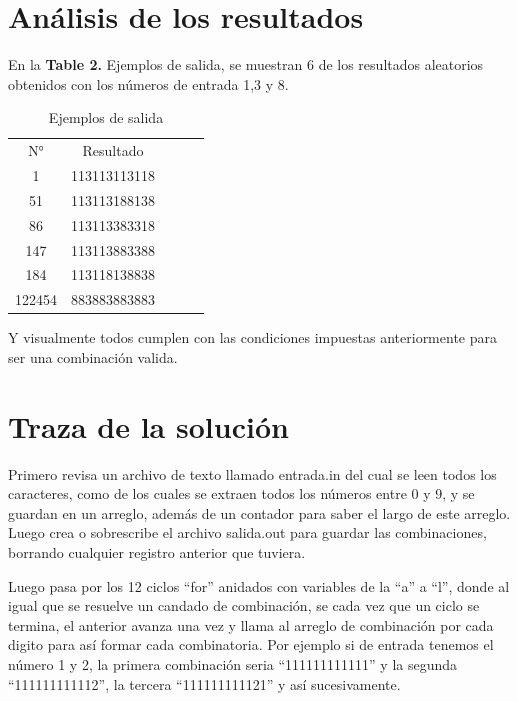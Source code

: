 \documentclass[9pt,twocolumn,twoside]{optica}
\begin{document}
\section{Análisis de los resultados}

En la \textbf{Table 2.} Ejemplos de salida, se muestran 6 de los resultados aleatorios obtenidos con los números de entrada 1,3 y 8. 

\begin{table}
\centering
\caption{Ejemplos de salida }
\label{my-label}
\begin{tabular}{|c|c|lll}
\cline{1-2}
N° & Resultado &  &  &  \\ \cline{1-2}
1         & 113113113118         &  &  &  \\ \cline{1-2}
51         & 113113188138         &  &  &  \\ \cline{1-2}
86         & 113113383318         &  &  &  \\ \cline{1-2}
147         & 113113883388         &  &  &  \\ \cline{1-2}
184         & 113118138838         &  &  &  \\ \cline{1-2}
122454         & 883883883883         &  &  &  \\ \cline{1-2}
\end{tabular}
\end{table}

Y visualmente todos cumplen con las condiciones impuestas anteriormente para ser una combinación valida.

\section{Traza de la solución}

Primero revisa un archivo de texto llamado entrada.in del cual se leen todos los caracteres, como de los cuales se extraen todos los números entre 0 y 9, y se guardan en un arreglo, además de un contador para saber el largo de este arreglo.
Luego crea o sobrescribe el archivo salida.out para guardar las combinaciones, borrando cualquier registro anterior que tuviera.


Luego pasa por los 12 ciclos “for” anidados con variables de la “a” a “l”, donde al igual que se resuelve un candado de combinación, se cada vez que un ciclo se termina, el anterior avanza una vez y llama al arreglo de combinación por cada digito para así formar cada combinatoria. Por ejemplo si de entrada tenemos el número 1 y 2, la primera combinación seria “111111111111” y la segunda “111111111112”, la tercera “111111111121” y así sucesivamente.
\end{document}
